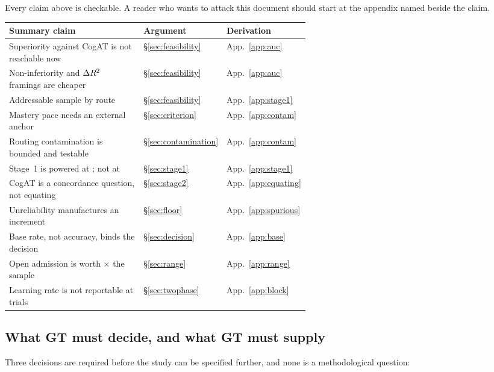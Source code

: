 \documentclass[11pt,a4paper]{article}
\begin{document}
Every claim above is checkable. A reader who wants to attack this document
should start at the appendix named beside the claim.

\begin{center}
\small
\begin{tabular}{@{}p{0.58\linewidth}ll@{}}
\toprule
\textbf{Summary claim} & \textbf{Argument} & \textbf{Derivation} \\
\midrule
Superiority against CogAT is not reachable now & \S\ref{sec:feasibility} & App.~\ref{app:auc} \\
Non-inferiority and $\Delta R^{2}$ framings are cheaper & \S\ref{sec:feasibility} & App.~\ref{app:auc} \\
Addressable sample by route & \S\ref{sec:feasibility} & App.~\ref{app:stage1} \\
Mastery pace needs an external anchor & \S\ref{sec:criterion} & App.~\ref{app:contam} \\
Routing contamination is bounded and testable & \S\ref{sec:contamination} & App.~\ref{app:contam} \\
Stage~1 is powered at \Nbothcohorts{}; not at \NcampusCohort{} & \S\ref{sec:stage1} & App.~\ref{app:stage1} \\
CogAT is a concordance question, not equating & \S\ref{sec:stage2} & App.~\ref{app:equating} \\
Unreliability manufactures an increment & \S\ref{sec:floor} & App.~\ref{app:spurious} \\
Base rate, not accuracy, binds the decision & \S\ref{sec:decision} & App.~\ref{app:base} \\
Open admission is worth \NmultiplierTen{}$\times$ the sample & \S\ref{sec:range} & App.~\ref{app:range} \\
Learning rate is not reportable at \BlockAdministered{} trials & \S\ref{sec:twophase} & App.~\ref{app:block} \\
\bottomrule
\end{tabular}
\end{center}

\subsection{What GT must decide, and what GT must supply}

Three decisions are required before the study can be specified further, and none
is a methodological question:
\end{document}
